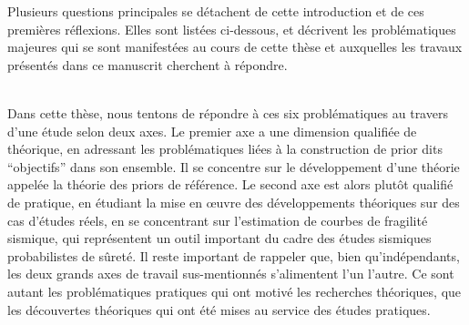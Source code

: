 Plusieurs questions principales se détachent de cette introduction et de ces premières réflexions. Elles sont listées ci-dessous, et décrivent les problématiques majeures qui se sont manifestées au cours de cette thèse et auxquelles les travaux présentés dans ce manuscrit cherchent à répondre.\\[-1pt]







\\


Dans cette thèse, nous tentons de répondre à ces six problématiques au travers d'une étude selon deux axes. Le premier axe a une dimension qualifiée de théorique, en adressant les problématiques liées à la construction de prior dits ``objectifs'' dans son ensemble. Il se concentre sur le développement d'une théorie appelée la théorie des priors de référence. Le second axe est alors plutôt qualifié de pratique, en étudiant la mise en œuvre des développements théoriques sur des cas d'études réels, en se concentrant sur l'estimation de courbes de fragilité sismique, qui représentent un outil important du cadre des études sismiques probabilistes de sûreté.
Il reste important de rappeler que, bien qu'indépendants, les deux grands axes de travail sus-mentionnés s'alimentent l'un l'autre. Ce sont autant les problématiques pratiques qui ont motivé les recherches théoriques, que les découvertes théoriques qui ont été mises au service des études pratiques.\\


